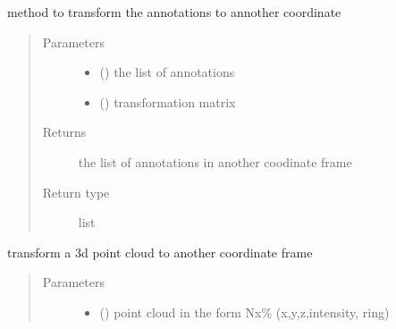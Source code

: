 \documentclass[letterpaper,10pt,english]{sphinxmanual}
\begin{document}
\begin{fulllineitems}
\begin{fulllineitems}
\end{fulllineitems}


\begin{fulllineitems}
\label{\detokenize{radiate:radiate.Sequence.transform_annotations}}
method to transform the annotations to annother coordinate
\begin{quote}\begin{description}
\item[{Parameters}] \leavevmode\begin{itemize}
\item {} 
 () \textendash{} the list of annotations

\item {} 
 () \textendash{} transformation matrix

\end{itemize}

\item[{Returns}] \leavevmode
the list of annotations in another coodinate frame

\item[{Return type}] \leavevmode
list

\end{description}\end{quote}

\end{fulllineitems}


\begin{fulllineitems}
\label{\detokenize{radiate:radiate.Sequence.transform_point_cloud}}
transform a 3d point cloud to another coordinate frame
\begin{quote}\begin{description}
\item[{Parameters}] \leavevmode\begin{itemize}
\item {} 
 () \textendash{} point cloud in the form Nx\% (x,y,z,intensity, ring)


\end{itemize}
\end{description}
\end{quote}
\end{fulllineitems}
\end{fulllineitems}
\end{document}
